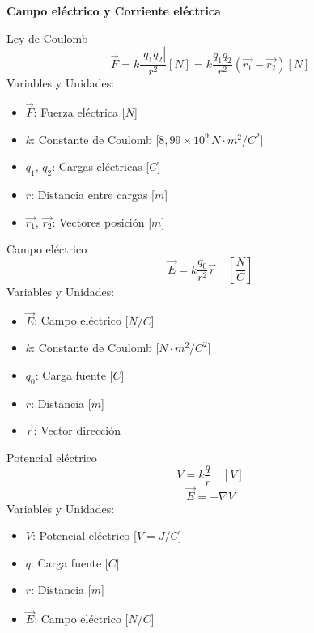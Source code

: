 \documentclass{article}
\begin{document}
\begin{center}
    \LARGE \textbf{Campo eléctrico y Corriente eléctrica}
\end{center}

\begin{multicols}{3}

\begin{teorema}{Ley de Coulomb}
    $$\vec{F} = k\frac{|q_1q_2|}{r^2}[N] = k\frac{q_1q_2}{r^2}(\vec{r_1} - \vec{r_2}) [N]$$
    Variables y Unidades:
    \begin{itemize}
        \item $\vec{F}$: Fuerza eléctrica [$N$]
        \item $k$: Constante de Coulomb [$8,99 \times 10^9 \, N\cdot m^2/C^2$]
        \item $q_1$, $q_2$: Cargas eléctricas [$C$]
        \item $r$: Distancia entre cargas [$m$]
        \item $\vec{r_1}$, $\vec{r_2}$: Vectores posición [$m$]
    \end{itemize}
\end{teorema}

\begin{teorema}{Campo eléctrico}
    $$\vec{E} = k\frac{q_0}{r^2}\vec{r}\quad [\frac{N}{C}]$$
    Variables y Unidades:
    \begin{itemize}
        \item $\vec{E}$: Campo eléctrico [$N/C$]
        \item $k$: Constante de Coulomb [$N\cdot m^2/C^2$]
        \item $q_0$: Carga fuente [$C$]
        \item $r$: Distancia [$m$]
        \item $\vec{r}$: Vector dirección
    \end{itemize}
\end{teorema}

\begin{teorema}{Potencial eléctrico}
    $$V = k\frac{q}{r} \quad [V]$$
    $$\vec{E} = -\nabla V$$
    Variables y Unidades:
    \begin{itemize}
        \item $V$: Potencial eléctrico [$V = J/C$]
        \item $q$: Carga fuente [$C$]
        \item $r$: Distancia [$m$]
        \item $\vec{E}$: Campo eléctrico [$N/C$]
    \end{itemize}
\end{teorema}


\end{multicols}
\end{document}
